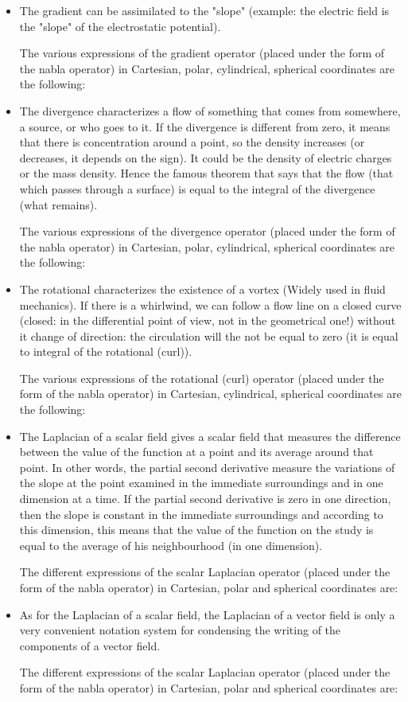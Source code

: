 	\begin{itemize}
		\item The gradient can be assimilated to the "slope" (example: the electric field is the "slope" of the electrostatic potential).
		
		The various expressions of the gradient operator (placed under the form of the nabla operator) in Cartesian, polar, cylindrical, spherical coordinates are the following:
		
		
		\item The divergence characterizes a flow of something that comes from somewhere, a source, or who goes to it. If the divergence is different from zero, it means that there is concentration around a point, so the density increases (or decreases, it depends on the sign). It could be the density of electric charges or the mass density. Hence the famous theorem that says that the flow (that which passes through a surface) is equal to the integral of the divergence (what remains).
		
		The various expressions of the divergence operator (placed under the form of the nabla operator) in Cartesian, polar, cylindrical, spherical coordinates are the following:
		
		
		\item The rotational characterizes the existence of a vortex (Widely used in fluid mechanics). If there is a whirlwind, we can follow a flow line on a closed curve (closed: in the differential point of view, not in the geometrical one!) without it change of direction: the circulation will the not be equal to zero (it is equal to integral of the rotational (curl)).
		
		The various expressions of the rotational (curl) operator (placed under the form of the nabla operator) in Cartesian, cylindrical, spherical coordinates are the following:
		
		
		\item The Laplacian of a scalar field gives a scalar field that measures the difference between the value of the function at a point and its average around that point. In other words, the partial second derivative measure the variations of the slope at the point examined in the immediate surroundings and in one dimension at a time. If the partial second derivative is zero in one direction, then the slope is constant in the immediate surroundings and according to this dimension, this means that the value of the function on the study is equal to the average of his neighbourhood (in one dimension).
		
		The different expressions of the scalar Laplacian operator (placed under the form of the nabla operator) in Cartesian, polar and spherical coordinates are:
		
		
		\item As for the Laplacian of a scalar field, the Laplacian of a vector field is only a very convenient notation system for condensing the writing of the components of a vector field.
		
		The different expressions of the scalar Laplacian operator (placed under the form of the nabla operator) in Cartesian, polar and spherical coordinates are:
		
	\end{itemize}
